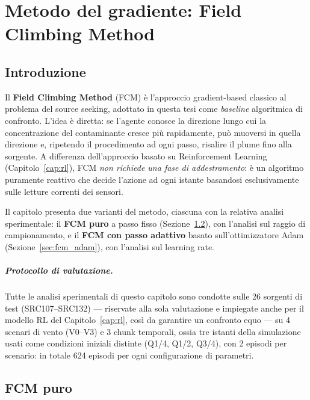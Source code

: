\chapter{Metodo del gradiente: Field Climbing Method}
\label{cap:fcm}

\section{Introduzione}

Il \textbf{Field Climbing Method} (FCM) \`e l'approccio gradient-based classico al
problema del source seeking, adottato in questa tesi come \emph{baseline} algoritmica di
confronto. L'idea \`e diretta: se l'agente conosce la direzione lungo cui la
concentrazione del contaminante cresce pi\`u rapidamente, pu\`o muoversi in quella
direzione e, ripetendo il procedimento ad ogni passo, risalire il plume fino alla
sorgente. A differenza dell'approccio basato su Reinforcement Learning
(Capitolo~\ref{cap:rl}), FCM \emph{non richiede una fase di addestramento}: \`e un
algoritmo puramente reattivo che decide l'azione ad ogni istante basandosi
esclusivamente sulle letture correnti dei sensori.

Il capitolo presenta due varianti del metodo, ciascuna con la relativa analisi
sperimentale: il \textbf{FCM puro} a passo fisso (Sezione~\ref{sec:fcm_puro}), con
l'analisi sul raggio di campionamento, e il \textbf{FCM con passo adattivo} basato
sull'ottimizzatore Adam (Sezione~\ref{sec:fcm_adam}), con l'analisi sul learning rate.

\paragraph{Protocollo di valutazione.}
Tutte le analisi sperimentali di questo capitolo sono condotte sulle 26 sorgenti di test
(SRC107--SRC132) --- riservate alla sola valutazione e impiegate anche per il modello RL
del Capitolo~\ref{cap:rl}, cos\`i da garantire un confronto equo --- su 4 scenari di vento
(V0--V3) e 3 chunk temporali, ossia tre istanti della simulazione usati come condizioni
iniziali distinte (Q1/4, Q1/2, Q3/4), con 2 episodi per scenario: in totale 624 episodi
per ogni configurazione di parametri.

\section{FCM puro}
\label{sec:fcm_puro}

